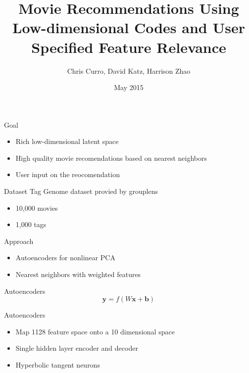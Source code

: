 \documentclass{beamer}
\title{Movie Recommendations Using Low-dimensional Codes and User Specified Feature Relevance}
\author{Chris Curro, David Katz, Harrison Zhao}
\date{May 2015}
\begin{document}
\begin{frame}
\titlepage
\end{frame}

\begin{frame}{Goal}
\begin{itemize}
\item Rich low-dimensional latent space
\item High quality movie recomendations based on nearest neighbors
\item User input on the reocomendation
\end{itemize}
\end{frame}

\begin{frame}{Dataset}
Tag Genome dataset provied by grouplens
\begin{itemize}
\item 10,000 movies
\item 1,000 tags
\end{itemize}
\end{frame}

\begin{frame}{Approach}
\begin{itemize}
\item Autoencoders for nonlinear PCA
\item Nearest neighbors with weighted features
\end{itemize}
\end{frame}

\begin{frame}{Autoencoders}
\begin{equation}
\mathbf{y} = f\left(W\mathbf{x} + \mathbf{b}\right)
\end{equation}
\begin{center}

\end{center}
\end{frame}

\begin{frame}{Autoencoders}
\begin{itemize}
\item Map 1128 feature space onto a 10 dimensional space
\item Single hidden layer encoder and decoder
\item Hyperbolic tangent neurons
\end{itemize}
\end{frame}
\end{document}
